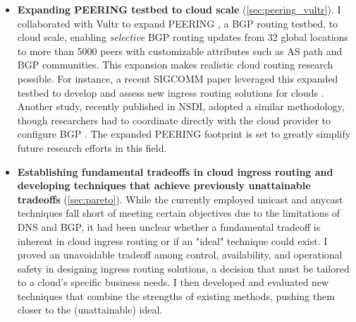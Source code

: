 \documentclass[sigconf,nonacm,screen,letterpaper,9pt]{acmart}
\begin{document}
\begin{itemize}[leftmargin=*]
\item


 \textbf{Expanding PEERING testbed to cloud scale} (\cref{sec:peering_vultr}). I collaborated with Vultr to expand PEERING \cite{schlinker19peering}, a BGP routing testbed, to cloud scale, enabling \textit{selective} BGP routing updates from 32 global locations to more than 5000 peers with customizable attributes such as AS path and BGP communities. This expansion makes realistic cloud routing research possible. For instance, a recent SIGCOMM paper leveraged this expanded testbed to develop and assess new ingress routing solutions for clouds \cite{painter}. Another study, recently published in NSDI, adopted a similar methodology, though researchers had to coordinate directly with the cloud provider to configure BGP \cite{tango-nsdi}. The expanded PEERING footprint is set to greatly simplify future research efforts in this field.


\item 
\textbf{Establishing fundamental tradeoffs in cloud ingress routing and developing techniques that achieve previously unattainable tradeoffs} (\cref{sec:pareto}). While the currently employed unicast and anycast techniques fall short of meeting certain objectives due to the limitations of DNS and BGP, it had been unclear whether a fundamental tradeoff is inherent in cloud ingress routing or if an "ideal" technique could exist. I proved an unavoidable tradeoff among control, availability, and operational safety in designing ingress routing solutions, a decision that must be tailored to a cloud's specific business needs. I then developed and evaluated new techniques that combine the strengths of existing methods, pushing them closer to the (unattainable) ideal.



\end{itemize}
\end{document}
